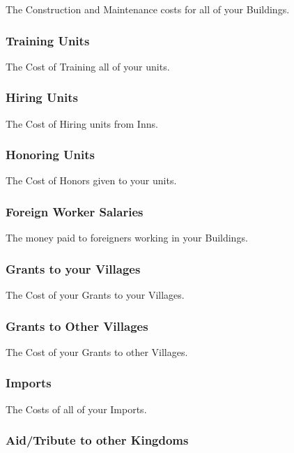 {The Construction and Maintenance costs for all of your Buildings.

\subsubsection{\textsf{Training Units}}

The Cost of Training all of your units.

\subsubsection{\textsf{Hiring Units}}

The Cost of Hiring units from Inns.

\subsubsection{\textsf{Honoring Units}}

The Cost of Honors given to your units.

\subsubsection{\textsf{Foreign Worker Salaries}}

The money paid to foreigners working in your Buildings.

\subsubsection{\textsf{Grants to your Villages}}

The Cost of your Grants to your Villages.

\subsubsection{\textsf{Grants to Other Villages}}

The Cost of your Grants to other Villages.

\subsubsection{\textsf{Imports}}

The Costs of all of your Imports.

\subsubsection{\textsf{Aid/Tribute to other Kingdom}s}

}
